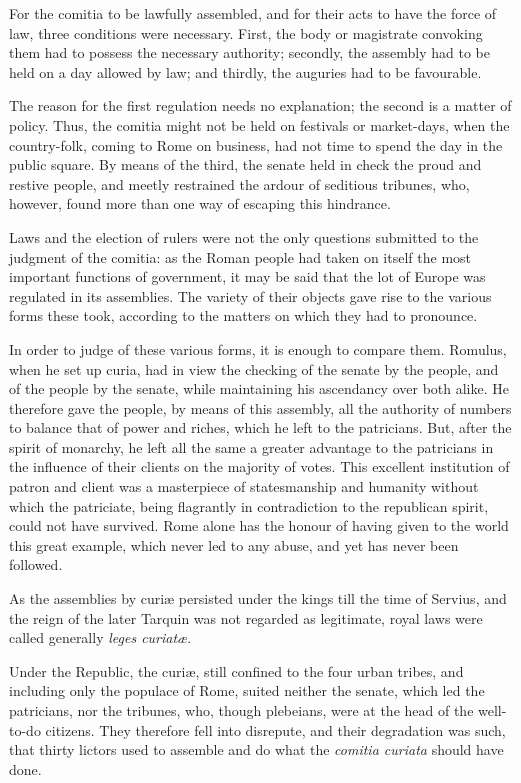 \documentclass[12pt]{book}
\begin{document}
For the comitia to be lawfully assembled, and for their acts to have the force of law, three conditions were necessary. First, the body or magistrate convoking them had to possess the necessary authority; secondly, the assembly had to be held on a day allowed by law; and thirdly, the auguries had to be favourable.

The reason for the first regulation needs no explanation; the second is a matter of policy. Thus, the comitia might not be held on festivals or market-days, when the country-folk, coming to Rome on business, had not time to spend the day in the public square. By means of the third, the senate held in check the proud and restive people, and meetly restrained the ardour of seditious tribunes, who, however, found more than one way of escaping this hindrance.

Laws and the election of rulers were not the only questions submitted to the judgment of the comitia: as the Roman people had taken on itself the most important functions of government, it may be said that the lot of Europe was regulated in its assemblies. The variety of their objects gave rise to the various forms these took, according to the matters on which they had to pronounce.

In order to judge of these various forms, it is enough to compare them. Romulus, when he set up curia, had in view the checking of the senate by the people, and of the people by the senate, while maintaining his ascendancy over both alike. He therefore gave the people, by means of this assembly, all the authority of numbers to balance that of power and riches, which he left to the patricians. But, after the spirit of monarchy, he left all the same a greater advantage to the patricians in the influence of their clients on the majority of votes. This excellent institution of patron and client was a masterpiece of statesmanship and humanity without which the patriciate, being flagrantly in contradiction to the republican spirit, could not have survived. Rome alone has the honour of having given to the world this great example, which never led to any abuse, and yet has never been followed.

As the assemblies by curiæ persisted under the kings till the time of Servius, and the reign of the later Tarquin was not regarded as legitimate, royal laws were called generally \textit{leges curiatæ}.

Under the Republic, the curiæ, still confined to the four urban tribes, and including only the populace of Rome, suited neither the senate, which led the patricians, nor the tribunes, who, though plebeians, were at the head of the well-to-do citizens. They therefore fell into disrepute, and their degradation was such, that thirty lictors used to assemble and do what the \textit{comitia curiata} should have done.
\end{document}
